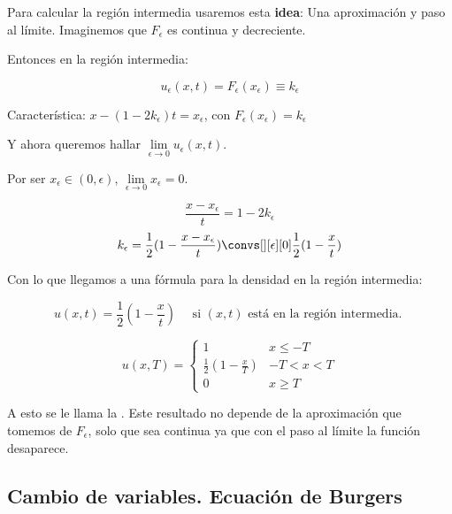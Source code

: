 			Para calcular la región intermedia usaremos esta \textbf{idea}: Una aproximación y paso al límite. Imaginemos que $F_\epsilon$ es continua y decreciente.

			\begin{figure}[hbtp]
				\centering
				\caption{}
				\label{fig:FEpsilon}
			\end{figure}

			Entonces en la región intermedia:

			$$u_\epsilon (x,t) = F_\epsilon (x_\epsilon) \equiv k_\epsilon $$

			Característica: $x - (1-2k_\epsilon) t = x_\epsilon$, con $F_\epsilon(x_\epsilon) = k_\epsilon$

			Y ahora queremos hallar $\lim\limits_{\epsilon \rightarrow 0} u_\epsilon(x,t).$

			Por ser $x_\epsilon \in (0,\epsilon)$, $\lim\limits_{\epsilon \rightarrow 0} x_\epsilon = 0$.

			$$ \frac{x - x_\epsilon}{t} = 1-2k_\epsilon$$
			$$k_\epsilon = \frac{1}{2} (1 - \frac{x-x_\epsilon}{t}) \convs[][\epsilon][0] \frac{1}{2} (1 - \frac{x}{t})$$

			Con lo que llegamos a una fórmula para la densidad en la región intermedia:

			$$u(x,t) = \frac{1}{2} (1 - \frac{x}{t}) \quad \text{ si } (x,t) \text{ está en la región intermedia. }$$

			\begin{figure}[hbtp]
				\centering
				\caption{}
				\label{fig:SolucionTFijo}
			\end{figure}

			$$u(x,T) =
			\begin{cases}
				1 & x \leq -T \\
				\frac{1}{2} (1 - \frac{x}{T}) & -T < x < T \\
				0 & x \geq T
			\end{cases}
			$$

			A esto se le llama la . Este resultado no depende de la aproximación que tomemos de $F_\epsilon$, solo que sea continua ya que con el paso al límite la función desaparece.



	\subsection{Cambio de variables. Ecuación de Burgers}

